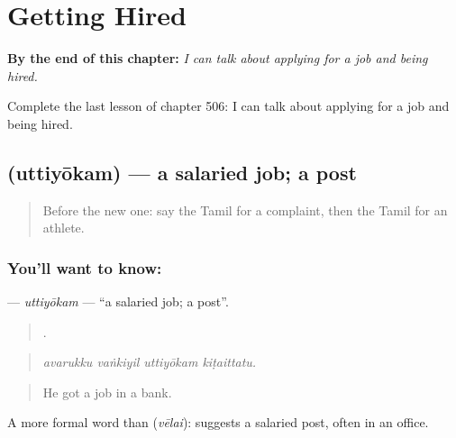 
\chapter{Getting Hired}
\label{ch:ta-getting-hired}

\begin{chapteropening}
\textbf{By the end of this chapter:} \emph{I can talk about applying for a job and being hired.}

Complete the last lesson of chapter 506: I can talk about applying for a job and being hired.
\end{chapteropening}

\section[\texorpdfstring{\ta{உத்தியோகம்} (uttiyōkam)}{உத்தியோகம் (uttiyōkam)}]{ (uttiyōkam) — a salaried job; a post}

\label{lesson:TA-C506-uttiyokam}



\begin{quote}
Before the new one: say the Tamil for a complaint, then the Tamil for an athlete.
\end{quote}

\subsection*{You'll want to know: }
\textbf{} — \emph{uttiyōkam} — \textquotedblleft{}a salaried job; a post\textquotedblright{}.

\begin{quote}
   .
\end{quote}

\begin{quote}
\emph{avarukku vaṅkiyil uttiyōkam kiṭaittatu.}
\end{quote}

\begin{quote}
He got a job in a bank.
\end{quote}

A more formal word than  (\emph{vēlai}):  suggests a salaried post, often in an office.

